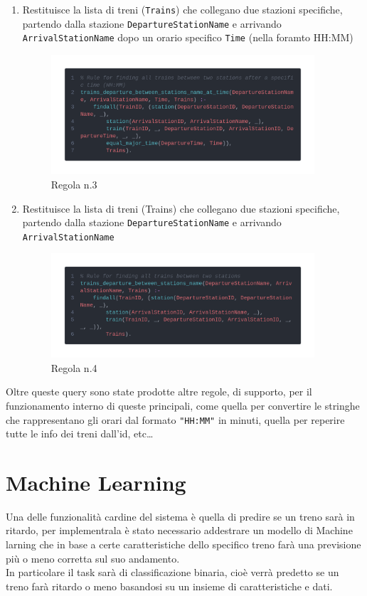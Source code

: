 \documentclass[italian,12pt,a4paper]{article}
\begin{document}
\begin{enumerate}
\begin{figure}[h]
			\end{figure}
			\newpage
		\item Restituisce la lista di treni (\texttt{Trains}) che collegano due stazioni specifiche, partendo dalla stazione \texttt{DepartureStationName} e arrivando \texttt{ArrivalStationName} dopo un orario specifico \texttt{Time} (nella foramto HH:MM)
			\begin{figure}[h]
				\centering
				\includegraphics[width=370px]{img/code4}
				\caption{Regola n.3}

			\end{figure}
		\item Restituisce la lista di treni (Trains) che collegano due stazioni specifiche, partendo dalla stazione \texttt{DepartureStationName} e arrivando \texttt{ArrivalStationName}
			\begin{figure}[h]
				\centering
				\includegraphics[width=370px]{img/code3}
				\caption{Regola n.4}

			\end{figure}

				
	\end{enumerate}
	
	
	Oltre queste query sono state prodotte altre regole, di supporto, per il funzionamento interno di queste principali, come quella per convertire le stringhe che rappresentano gli orari dal formato \texttt{"HH:MM"} in minuti, quella per reperire tutte le info dei treni dall'id, etc\dots

	\section{Machine Learning}
		Una delle funzionalità cardine del sistema è quella di predire se un treno sarà in ritardo, per implementrala è stato necessario addestrare un modello di Machine larning che in base a certe caratteristiche dello specifico treno farà una previsione più o meno corretta sul suo andamento. \\
		\linebreak
		In particolare il task sarà di classificazione binaria, cioè verrà predetto se un treno farà ritardo o meno basandosi su un insieme di caratteristiche e dati.
	
\end{document}
